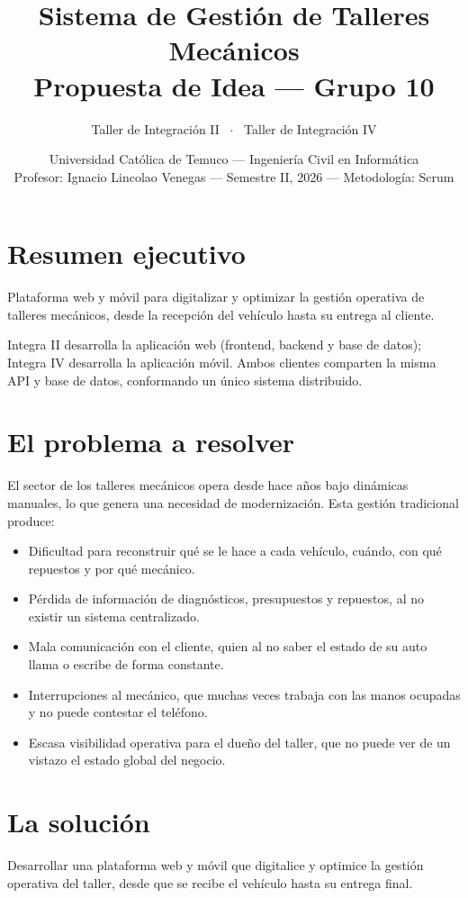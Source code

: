 \documentclass[11pt]{article}
\title{\vspace{-1.2cm}\textbf{Sistema de Gestión de Talleres Mecánicos}\\[4pt]
\large Propuesta de Idea — Grupo 10}
\author{Taller de Integración II \ $\cdot$ \ Taller de Integración IV}
\date{Universidad Católica de Temuco — Ingeniería Civil en Informática\\
Profesor: Ignacio Lincolao Venegas — Semestre II, 2026 — Metodología: Scrum}
\begin{document}
\maketitle
\tableofcontents
\bigskip

\section{Resumen ejecutivo}

Plataforma web y móvil para digitalizar y optimizar la gestión operativa de talleres mecánicos, desde la recepción del vehículo hasta su entrega al cliente.

Integra II desarrolla la aplicación web (frontend, backend y base de datos); Integra IV desarrolla la aplicación móvil. Ambos clientes comparten la misma API y base de datos, conformando un único sistema distribuido.

\section{El problema a resolver}

El sector de los talleres mecánicos opera desde hace años bajo dinámicas manuales, lo que genera una necesidad de modernización. Esta gestión tradicional produce:

\begin{itemize}
  \item Dificultad para reconstruir qué se le hace a cada vehículo, cuándo, con qué repuestos y por qué mecánico.
  \item Pérdida de información de diagnósticos, presupuestos y repuestos, al no existir un sistema centralizado.
  \item Mala comunicación con el cliente, quien al no saber el estado de su auto llama o escribe de forma constante.
  \item Interrupciones al mecánico, que muchas veces trabaja con las manos ocupadas y no puede contestar el teléfono.
  \item Escasa visibilidad operativa para el dueño del taller, que no puede ver de un vistazo el estado global del negocio.
\end{itemize}

\section{La solución}

Desarrollar una plataforma web y móvil que digitalice y optimice la gestión operativa del taller, desde que se recibe el vehículo hasta su entrega final.
\end{document}
